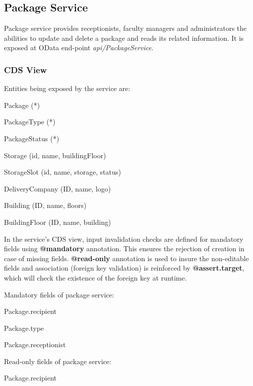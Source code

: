 \subsection{Package Service}
Package service provides receptionists, faculty managers and administrators the abilities to update and delete a package and reads its related information. It is exposed at OData end-point \textit{api/PackageService}.

\subsubsection{CDS View}

Entities being exposed by the service are:
\begin{compactenum}
	\item Package (*)
    \item PackageType (*)
    \item PackageStatus (*)
    \item Storage (id, name, buildingFloor)
    \item StorageSlot (id, name, storage, status)
    \item DeliveryCompany (ID, name, logo)
    \item Building (ID, name, floors)
    \item BuildingFloor (ID, name, building)
\end{compactenum}

\bigskip
In the service's CDS view, input invalidation checks are defined for mandatory fields using \textbf{@mandatory} annotation. This ensures the rejection of creation in case of missing fields. \textbf{@read-only} annotation is used to insure the non-editable fields and association (foreign key validation) is reinforced by \textbf{@assert.target}, which will check the existence of the foreign key at runtime.

\bigskip
Mandatory fields of package service:
\begin{compactenum}
	\item Package.recipient
    \item Package.type
    \item Package.receptionist
\end{compactenum}

\bigskip
Read-only fields of package service:
\begin{compactenum}
	\item Package.recipient
\end{compactenum}

